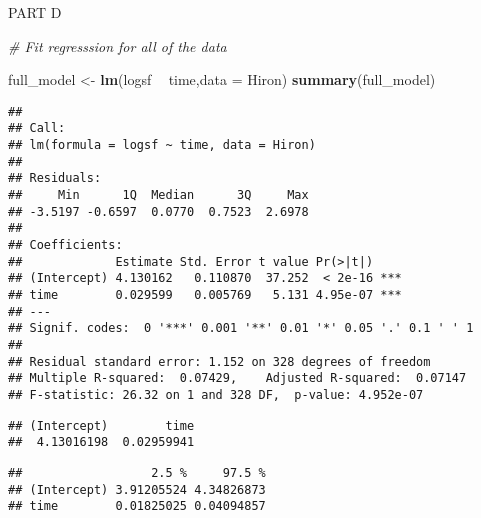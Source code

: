 \documentclass[]{article}
\newenvironment{Shaded}{\begin{snugshade}}{\end{snugshade}}
\newcommand{\KeywordTok}[1]{\textcolor[rgb]{0.13,0.29,0.53}{\textbf{#1}}}
\newcommand{\DataTypeTok}[1]{\textcolor[rgb]{0.13,0.29,0.53}{#1}}
\newcommand{\StringTok}[1]{\textcolor[rgb]{0.31,0.60,0.02}{#1}}
\newcommand{\CommentTok}[1]{\textcolor[rgb]{0.56,0.35,0.01}{\textit{#1}}}
\newcommand{\OperatorTok}[1]{\textcolor[rgb]{0.81,0.36,0.00}{\textbf{#1}}}
\newcommand{\NormalTok}[1]{#1}
\begin{document}
PART D

\begin{Shaded}
\begin{Highlighting}[]
\CommentTok{# Fit regresssion for all of the data}

\NormalTok{full_model <-}\StringTok{ }\KeywordTok{lm}\NormalTok{(logsf }\OperatorTok{~}\StringTok{ }\NormalTok{time,}\DataTypeTok{data =}\NormalTok{ Hiron)}
\KeywordTok{summary}\NormalTok{(full_model)}
\end{Highlighting}
\end{Shaded}

\begin{verbatim}
## 
## Call:
## lm(formula = logsf ~ time, data = Hiron)
## 
## Residuals:
##     Min      1Q  Median      3Q     Max 
## -3.5197 -0.6597  0.0770  0.7523  2.6978 
## 
## Coefficients:
##             Estimate Std. Error t value Pr(>|t|)    
## (Intercept) 4.130162   0.110870  37.252  < 2e-16 ***
## time        0.029599   0.005769   5.131 4.95e-07 ***
## ---
## Signif. codes:  0 '***' 0.001 '**' 0.01 '*' 0.05 '.' 0.1 ' ' 1
## 
## Residual standard error: 1.152 on 328 degrees of freedom
## Multiple R-squared:  0.07429,    Adjusted R-squared:  0.07147 
## F-statistic: 26.32 on 1 and 328 DF,  p-value: 4.952e-07
\end{verbatim}

\begin{Shaded}
\end{Shaded}

\begin{verbatim}
## (Intercept)        time 
##  4.13016198  0.02959941
\end{verbatim}

\begin{Shaded}
\end{Shaded}

\begin{verbatim}
##                  2.5 %     97.5 %
## (Intercept) 3.91205524 4.34826873
## time        0.01825025 0.04094857
\end{verbatim}
\end{document}
